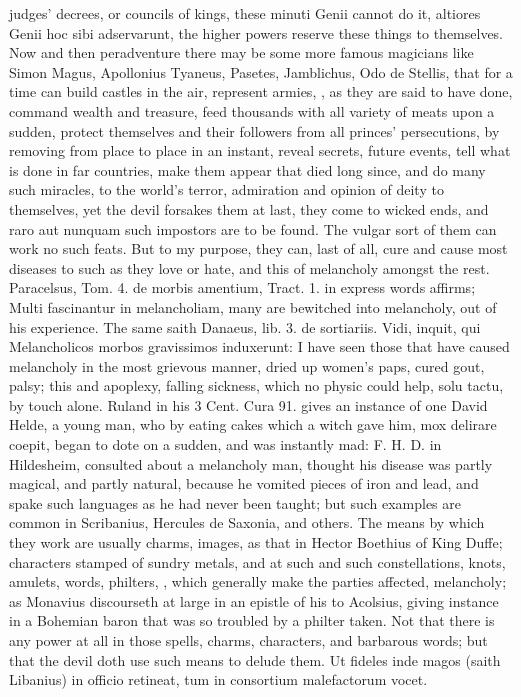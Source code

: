 {{judges' decrees, or councils of kings, these minuti Genii cannot do it,
altiores Genii hoc sibi adservarunt, the higher powers reserve these
things to themselves. Now and then peradventure there may be some more
famous magicians like Simon Magus, Apollonius Tyaneus, Pasetes,
Jamblichus, Odo de Stellis, that for a time can build castles in
the air, represent armies, \etc{}, as they are said to have done,
command wealth and treasure, feed thousands with all variety of meats
upon a sudden, protect themselves and their followers from all princes'
persecutions, by removing from place to place in an instant, reveal
secrets, future events, tell what is done in far countries, make them
appear that died long since, and do many such miracles, to the world's
terror, admiration and opinion of deity to themselves, yet the devil
forsakes them at last, they come to wicked ends, and raro aut nunquam
such impostors are to be found. The vulgar sort of them can work no
such feats. But to my purpose, they can, last of all, cure and cause
most diseases to such as they love or hate, and this of
melancholy amongst the rest. Paracelsus, Tom. 4. de morbis
amentium, Tract. 1. in express words affirms; Multi fascinantur in
melancholiam, many are bewitched into melancholy, out of his
experience. The same saith Danaeus, lib. 3. de sortiariis. Vidi,
inquit, qui Melancholicos morbos gravissimos induxerunt: I have seen
those that have caused melancholy in the most grievous manner,
dried up women's paps, cured gout, palsy; this and apoplexy,
falling sickness, which no physic could help, solu tactu, by touch
alone. Ruland in his 3 Cent. Cura 91. gives an instance of one David
Helde, a young man, who by eating cakes which a witch gave him, mox
delirare coepit, began to dote on a sudden, and was instantly mad: F.
H. D. in Hildesheim, consulted about a melancholy man, thought
his disease was partly magical, and partly natural, because he vomited
pieces of iron and lead, and spake such languages as he had never been
taught; but such examples are common in Scribanius, Hercules de
Saxonia, and others. The means by which they work are usually charms,
images, as that in Hector Boethius of King Duffe; characters stamped of
sundry metals, and at such and such constellations, knots, amulets,
words, philters, \etc{}, which generally make the parties affected,
melancholy; as Monavius discourseth at large in an epistle of his
to Acolsius, giving instance in a Bohemian baron that was so troubled
by a philter taken. Not that there is any power at all in those spells,
charms, characters, and barbarous words; but that the devil doth use
such means to delude them. Ut fideles inde magos (saith Libanius)
in officio retineat, tum in consortium malefactorum vocet.

}}
